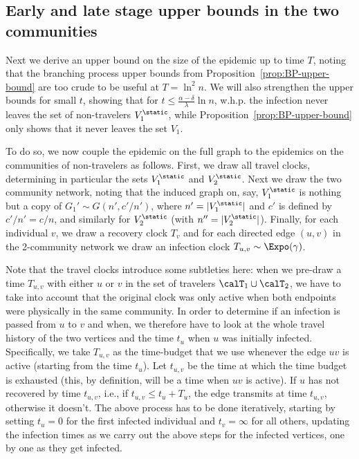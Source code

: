 \documentclass[11pt]{article}
\begin{document}
\subsection{Early and late stage upper bounds in the two communities}\label{sec:upper-bd-Rinfty}

Next we derive an upper bound on the size of the epidemic up to time $T$, noting that the branching process upper bounds from Proposition~\ref{prop:BP-upper-bound} are too crude to be useful at $T=\ln^2n$.  We  will also strengthen the upper bounds for small $t$, showing that for $t\leq \frac{\alpha-\delta}\lambda \ln n$, w.h.p. the infection never leaves the set of non-travelers $V_1^\static$, while Proposition~\ref{prop:BP-upper-bound} only shows that it never leaves the set $V_1$.

To do so, we now couple the epidemic on the full graph to the epidemics on the communities of non-travelers as follows.  
First, we draw all travel clocks, determining in particular the sets $V_1^\static$ and $V_2^\static$.
Next we draw the two community network, noting that the induced graph on, say, 
$V_1^\static$ is nothing but a copy of $G_1'\sim G(n',c'/n')$, where $n'=|V_1^\static|$ and $c'$ is defined by $c'/n'=c/n$, and similarly for $V_2^\static$ (with  $n''=|V_2^\static|$).
Finally, for each individual $v$, we draw a recovery clock $T_v$ and for 
each directed edge $(u,v)$ in the 2-community network we draw
an infection clock $T_{u,v}\sim \Expo(\gamma)$.

Note that the travel clocks introduce some subtleties here: when we pre-draw a time $T_{u, v}$ with either $u$ or $v$ in the set of travelers ${\calT}_1\cup\calT_2$, we have to take into account that the original clock was only active when both endpoints were physically in the same community. In order to determine if an infection is passed from $u$ to $v$ and when, we therefore have to look at the whole travel history of the two vertices and the time $t_u$ when $u$ was initially infected.  Specifically, we take $T_{u, v}$ as the time-budget that we use whenever the edge $uv$ is active (starting from the time $t_u$). Let $t_{u, v}$ be the time at which the time budget is exhausted (this, by definition, will be a time when $uv$ is active). If $u$ has not recovered by time $t_{u, v}$, i.e., if $t_{u, v}\leq t_u+T_u$, the edge transmits at time $t_{u, v}$, otherwise it doesn't.  The above process has to be done iteratively, starting by setting $t_u=0$ for the first infected individual and $t_v=\infty$ for all others, updating the infection times as we carry out the above steps for the infected vertices, one by one as they get infected.
\end{document}
